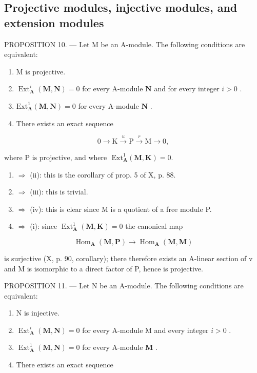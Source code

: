 \subsection{Projective modules, injective modules, and extension modules}

PROPOSITION 10. --- Let M be an A-module. The following conditions are equivalent:

\begin{enumerate}
\def\labelenumi{(\roman{enumi})}
\item
  M is projective.
\item
  \(\operatorname{Ext}_{\mathbf{A}}^{i}(\mathbf{M},\mathbf{N}) = 0\) for every A-module \(\mathbf{N}\) and for every integer \(i > 0\) .
\item
  \(\mathrm{Ext}_{\mathbf{A}}^{1}(\mathbf{M},\mathbf{N}) = 0\) for every A-module \(\mathbf{N}\) .
\item
  There exists an exact sequence
\end{enumerate}

\[
0 \rightarrow \mathrm{K} \xrightarrow {u} \mathrm{P} \xrightarrow {r} \mathrm{M} \rightarrow 0,
\]

\(\text{where P is projective, and where } \text{ Ext}_{\mathbf{A}}^{1}(\mathbf{M}, \mathbf{K}) = 0.\)

\begin{enumerate}
\def\labelenumi{(\roman{enumi})}
\item
  \(\Rightarrow\) (ii): this is the corollary of prop. 5 of X, p. 88.
\item
  \(\Rightarrow\) (iii): this is trivial.
\item
  \(\Rightarrow\) (iv): this is clear since M is a quotient of a free module P.
\item
  \(\Rightarrow\) (i): since \(\operatorname{Ext}_{\mathbf{A}}^{1}(\mathbf{M},\mathbf{K}) = 0\) the canonical map
\end{enumerate}

\[
\operatorname{Hom} _ {\mathbf {A}} (\mathbf {M}, \mathbf {P}) \rightarrow \operatorname{Hom} _ {\mathbf {A}} (\mathbf {M}, \mathbf {M})
\]

is surjective (X, p. 90, corollary); there therefore exists an A-linear section of v and M is isomorphic to a direct factor of P, hence is projective.

PROPOSITION 11. --- Let N be an A-module. The following conditions are equivalent:

\begin{enumerate}
\def\labelenumi{(\roman{enumi})}
\item
  N is injective.
\item
  \(\operatorname{Ext}_{\mathbf{A}}^{i}(\mathbf{M},\mathbf{N}) = 0\) for every A-module M and every integer \(i > 0\) .
\item
  \(\operatorname{Ext}_{\mathbf{A}}^{1}(\mathbf{M},\mathbf{N}) = 0\) for every A-module \(\mathbf{M}\) .
\item
  There exists an exact sequence
\end{enumerate}

